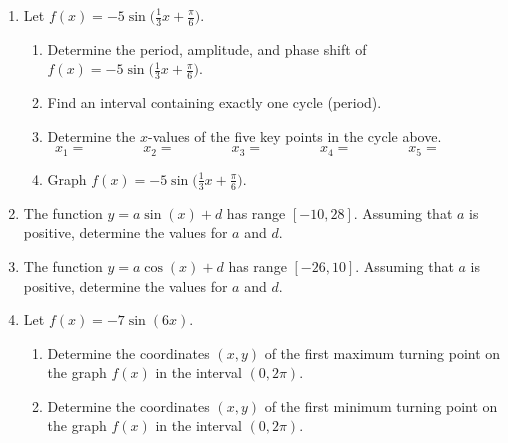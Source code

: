 \begin{enumerate}
\begin{enumerate}
\begin{tikzpicture}[y=.6cm, x=1.3cm,font=\sffamily]
  \end{tikzpicture}

\end{enumerate}


\newpage
\item Let $\displaystyle f(x)=-5\sin\Big(\frac{1}{3}x+\frac{\pi}{6}\Big)$.

\begin{enumerate}

\item Determine the period, amplitude, and phase shift of $\displaystyle f(x)=-5\sin\Big(\frac{1}{3}x+\frac{\pi}{6}\Big)$.\vfill
\item Find an interval containing exactly one cycle (period).\vfill
\item Determine the $x$-values of the five key points in the cycle above.
$$x_1= \quad \quad \quad \quad x_2= \quad \quad \quad \quad x_3= \quad \quad \quad \quad x_4= \quad \quad \quad \quad x_5= \quad \quad \quad \quad$$
\vfill





\item Graph $\displaystyle f(x)=-5\sin\Big(\frac{1}{3}x+\frac{\pi}{6}\Big)$.


\end{enumerate}


\newpage

\item The function $y=a\sin(x)+d$ has range $[-10,28]$.  Assuming that $a$ is positive, determine the values for $a$ and $d$.

\vfill
\item The function $y=a\cos(x)+d$ has range $[-26,10]$.  Assuming that $a$ is positive, determine the values for $a$ and $d$.
\vfill

\item Let $f(x)=-7\sin(6x)$.
\begin{enumerate}
\item Determine the coordinates $(x,y)$ of the first maximum turning point on the graph $f(x)$ in the interval $(0,2\pi)$.
\vfill

\item Determine the coordinates $(x,y)$ of the first minimum turning point on the graph $f(x)$ in the interval $(0,2\pi)$.
\vfill

\end{enumerate}



\end{enumerate}
